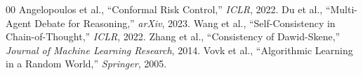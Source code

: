 \documentclass[conference]{IEEEtran}
\begin{document}
\begin{thebibliography}{00}
 Angelopoulos et al., ``Conformal Risk Control,'' \textit{ICLR}, 2022.
 Du et al., ``Multi-Agent Debate for Reasoning,'' \textit{arXiv}, 2023.
 Wang et al., ``Self-Consistency in Chain-of-Thought,'' \textit{ICLR}, 2022.
 Zhang et al., ``Consistency of Dawid-Skene,'' \textit{Journal of Machine Learning Research}, 2014.
 Vovk et al., ``Algorithmic Learning in a Random World,'' \textit{Springer}, 2005.
\end{thebibliography}
\end{document}
